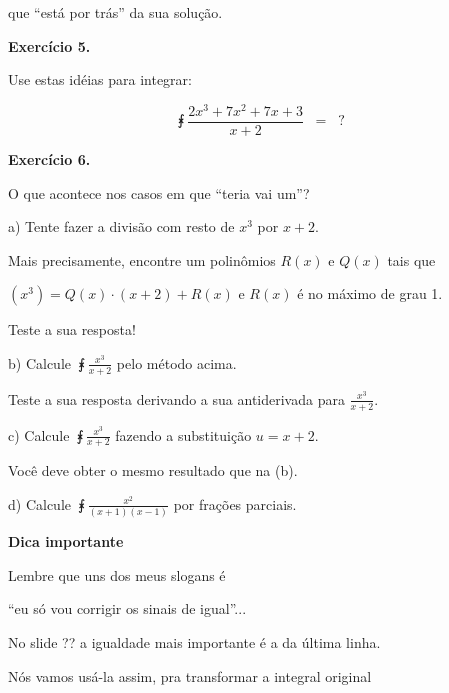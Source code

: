\documentclass[oneside,12pt]{article}
\begin{document}
que ``está por trás'' da sua solução.



\newpage


{\bf Exercício 5.}

\ssk

Use estas idéias para integrar:

$$\intx{\frac{2x^3 + 7x^2 + 7x + 3}{x+2}} \;\; = \;\; ?$$



\newpage


{\bf Exercício 6.}

\ssk

O que acontece nos casos em que ``teria vai um''?

\ssk

a) Tente fazer a divisão com resto de $x^3$ por $x+2$.

Mais precisamente, encontre um polinômios $R(x)$ e $Q(x)$ tais que

$(x^3) = Q(x) · (x+2) + R(x)$ e $R(x)$ é no máximo de grau 1.

Teste a sua resposta!

\ssk

b) Calcule $\intx{\frac{x^3}{x+2}}$ pelo método acima.

Teste a sua resposta derivando a sua antiderivada para $\frac{x^3}{x+2}$.

\ssk

c) Calcule $\intx{\frac{x^3}{x+2}}$ fazendo a substituição $u=x+2$.

Você deve obter o mesmo resultado que na (b).

\bsk

d) Calcule $\intx{\frac{x^2}{(x+1)(x-1)}}$ por frações parciais.


\newpage

{\bf Dica importante}

\ssk

Lembre que uns dos meus slogans é

``eu só vou corrigir os sinais de igual''...

No slide ?? a igualdade mais importante é a da última linha.

Nós vamos usá-la assim, pra transformar a integral original
\end{document}
